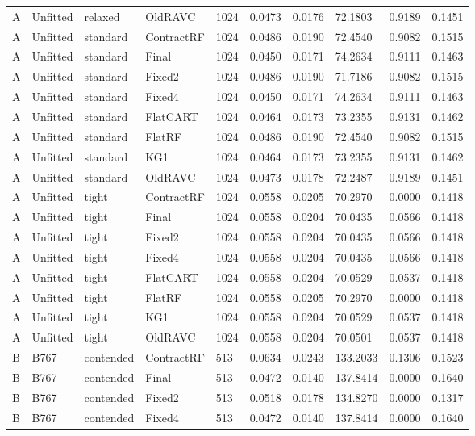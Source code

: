 \begin{longtable}{@{}llllllllll@{}}
A & Unfitted & relaxed & OldRAVC & 1024 & 0.0473 & 0.0176 & 72.1803 & 0.9189 & 0.1451\\
A & Unfitted & standard & ContractRF & 1024 & 0.0486 & 0.0190 & 72.4540 & 0.9082 & 0.1515\\
A & Unfitted & standard & Final & 1024 & 0.0450 & 0.0171 & 74.2634 & 0.9111 & 0.1463\\
A & Unfitted & standard & Fixed2 & 1024 & 0.0486 & 0.0190 & 71.7186 & 0.9082 & 0.1515\\
A & Unfitted & standard & Fixed4 & 1024 & 0.0450 & 0.0171 & 74.2634 & 0.9111 & 0.1463\\
A & Unfitted & standard & FlatCART & 1024 & 0.0464 & 0.0173 & 73.2355 & 0.9131 & 0.1462\\
A & Unfitted & standard & FlatRF & 1024 & 0.0486 & 0.0190 & 72.4540 & 0.9082 & 0.1515\\
A & Unfitted & standard & KG1 & 1024 & 0.0464 & 0.0173 & 73.2355 & 0.9131 & 0.1462\\
A & Unfitted & standard & OldRAVC & 1024 & 0.0473 & 0.0178 & 72.2487 & 0.9189 & 0.1451\\
A & Unfitted & tight & ContractRF & 1024 & 0.0558 & 0.0205 & 70.2970 & 0.0000 & 0.1418\\
A & Unfitted & tight & Final & 1024 & 0.0558 & 0.0204 & 70.0435 & 0.0566 & 0.1418\\
A & Unfitted & tight & Fixed2 & 1024 & 0.0558 & 0.0204 & 70.0435 & 0.0566 & 0.1418\\
A & Unfitted & tight & Fixed4 & 1024 & 0.0558 & 0.0204 & 70.0435 & 0.0566 & 0.1418\\
A & Unfitted & tight & FlatCART & 1024 & 0.0558 & 0.0204 & 70.0529 & 0.0537 & 0.1418\\
A & Unfitted & tight & FlatRF & 1024 & 0.0558 & 0.0205 & 70.2970 & 0.0000 & 0.1418\\
A & Unfitted & tight & KG1 & 1024 & 0.0558 & 0.0204 & 70.0529 & 0.0537 & 0.1418\\
A & Unfitted & tight & OldRAVC & 1024 & 0.0558 & 0.0204 & 70.0501 & 0.0537 & 0.1418\\
B & B767 & contended & ContractRF & 513 & 0.0634 & 0.0243 & 133.2033 & 0.1306 & 0.1523\\
B & B767 & contended & Final & 513 & 0.0472 & 0.0140 & 137.8414 & 0.0000 & 0.1640\\
B & B767 & contended & Fixed2 & 513 & 0.0518 & 0.0178 & 134.8270 & 0.0000 & 0.1317\\
B & B767 & contended & Fixed4 & 513 & 0.0472 & 0.0140 & 137.8414 & 0.0000 & 0.1640\\

\end{longtable}
